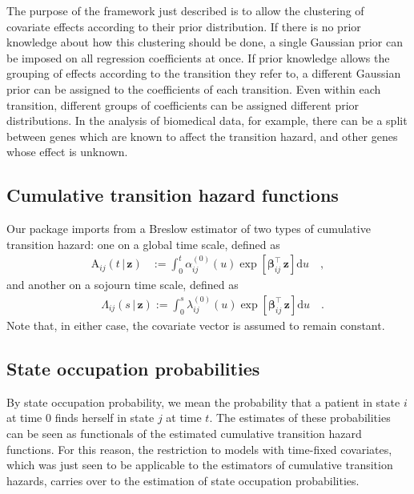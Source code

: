 The purpose of the framework just described is to allow the clustering of covariate effects according to their prior distribution.
If there is no prior knowledge about how this clustering should be done,  a single Gaussian prior can be imposed on all regression coefficients at once. If prior knowledge allows the grouping of effects according to the transition they refer to, a different Gaussian prior can be assigned to the coefficients of each transition. Even within each transition,  different groups of coefficients  can be assigned different prior distributions. In the analysis of biomedical data, for example, there can be a split between genes which are known to affect the transition hazard, and other genes whose effect is unknown.

\subsection{Cumulative transition hazard functions}

Our package imports from  a Breslow estimator of two types of cumulative transition hazard: one on a global time scale,  defined as
\begin{align*}
\mathrm{A}_{ij}\left(t\,|\,\mathbf{z}\right)&:=\int_{0}^{t}\alpha_{ij}^{(0)}\left(u\right)\exp\left[ \boldsymbol{\beta}^{\intercal}_{ij}\,\mathbf{z}\right]\mathrm{d}u\quad,
\end{align*}
and another on a sojourn time scale, defined as
\begin{align*}
&\Lambda_{ij}(s\,|\,\mathbf{z}):=\int_{0}^{s}\lambda_{ij}^{(0)}\left(u\right)\exp\left[ \boldsymbol{\beta}^{\intercal}_{ij}\,\mathbf{z}\right]\mathrm{d}u\quad.
\end{align*}
Note that, in either case, the covariate vector is assumed to remain constant.


\subsection{State occupation probabilities}
By state occupation probability, we mean the probability that a patient in state $i$ at time $0$ finds herself in state $j$ at time $t$.  The estimates of these probabilities can be seen as functionals of the estimated cumulative transition hazard functions.  For this reason,  the restriction to models with time-fixed covariates,  which was just seen to be applicable to the estimators of cumulative transition hazards,  carries over to the estimation of state occupation probabilities.  

